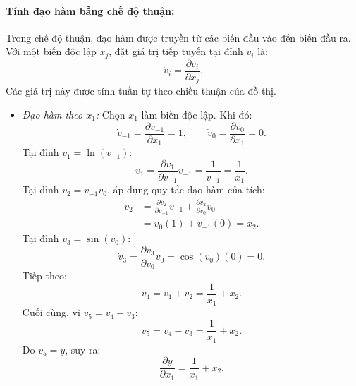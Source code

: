 \paragraph{Tính đạo hàm bằng chế độ thuận:\\}
Trong chế độ thuận, đạo hàm được truyền từ các biến đầu vào đến biến đầu ra. Với một biến độc lập $x_j$, đặt giá trị tiếp tuyến tại đỉnh $v_i$ là:
\begin{equation}
    \dot{v}_i = \frac{\partial v_i}{\partial x_j}.
\end{equation}
Các giá trị này được tính tuần tự theo chiều thuận của đồ thị.
\begin{itemize}
    \item \textit{Đạo hàm theo $x_1$:}
    Chọn $x_1$ làm biến độc lập. Khi đó:
    \begin{equation}
        \dot{v}_{-1} = \frac{\partial v_{-1}}{\partial x_1} = 1, \qquad \dot{v}_0 = \frac{\partial v_0}{\partial x_1} = 0.
    \end{equation}
    Tại đỉnh $v_1 = \ln(v_{-1})$:
    \begin{equation}
        \dot{v}_1 = \frac{\partial v_1}{\partial v_{-1}}\dot{v}_{-1} = \frac{1}{v_{-1}} = \frac{1}{x_1}.
    \end{equation}
    Tại đỉnh $v_2 = v_{-1} v_0$, áp dụng quy tắc đạo hàm của tích:
    \begin{equation}
    \begin{aligned}
        \dot{v}_2 &= \frac{\partial v_2}{\partial v_{-1}}\dot{v}_{-1} + \frac{\partial v_2}{\partial v_0}\dot{v}_0 \\
        &= v_0(1) + v_{-1}(0) = x_2.
    \end{aligned}
    \end{equation}
    Tại đỉnh $v_3 = \sin(v_0)$:
    \begin{equation}
        \dot{v}_3 = \frac{\partial v_3}{\partial v_0}\dot{v}_0 = \cos(v_0)(0) = 0.
    \end{equation} 
    Tiếp theo:
    \begin{equation}
        \dot{v}_4 = \dot{v}_1 + \dot{v}_2 = \frac{1}{x_1} + x_2.
    \end{equation}
    Cuối cùng, vì $v_5 = v_4 - v_3$:
    \begin{equation}
        \dot{v}_5 = \dot{v}_4 - \dot{v}_3 = \frac{1}{x_1} + x_2.
    \end{equation}
    Do $v_5 = y$, suy ra:
    \begin{equation}
        \frac{\partial y}{\partial x_1} = \frac{1}{x_1} + x_2.
        \label{eq:forward_dx1}
    \end{equation}


\end{itemize}

